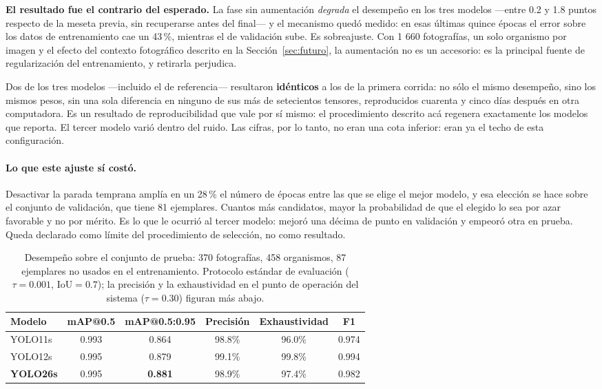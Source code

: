 \documentclass[onecolumn]{article}
\begin{document}
\textbf{El resultado fue el contrario del esperado.} La fase sin aumentación \emph{degrada} el desempeño en los tres modelos ---entre 0.2 y 1.8 puntos respecto de la meseta previa, sin recuperarse antes del final--- y el mecanismo quedó medido: en esas últimas quince épocas el error sobre los datos de entrenamiento cae un 43\,\%, mientras el de validación sube. Es sobreajuste. Con 1 660 fotografías, un solo organismo por imagen y el efecto del contexto fotográfico descrito en la Sección~\ref{sec:futuro}, la aumentación no es un accesorio: es la principal fuente de regularización del entrenamiento, y retirarla perjudica.

Dos de los tres modelos ---incluido el de referencia--- resultaron \textbf{idénticos} a los de la primera corrida: no sólo el mismo desempeño, sino los mismos pesos, sin una sola diferencia en ninguno de sus más de setecientos tensores, reproducidos cuarenta y cinco días después en otra computadora. Es un resultado de reproducibilidad que vale por sí mismo: el procedimiento descrito acá regenera exactamente los modelos que reporta. El tercer modelo varió dentro del ruido. Las cifras, por lo tanto, no eran una cota inferior: eran ya el techo de esta configuración.

\paragraph{Lo que este ajuste sí costó.} Desactivar la parada temprana amplía en un 28\,\% el número de épocas entre las que se elige el mejor modelo, y esa elección se hace sobre el conjunto de validación, que tiene 81 ejemplares. Cuantos más candidatos, mayor la probabilidad de que el elegido lo sea por azar favorable y no por mérito. Es lo que le ocurrió al tercer modelo: mejoró una décima de punto en validación y empeoró otra en prueba. Queda declarado como límite del procedimiento de selección, no como resultado.

\begin{table}[H]
\centering
\renewcommand{\arraystretch}{1.15}
\caption{Desempeño sobre el conjunto de prueba: 370 fotografías, 458 organismos, 87 ejemplares no usados en el entrenamiento. Protocolo estándar de evaluación ($\tau=0.001$, IoU$=0.7$); la precisión y la exhaustividad en el punto de operación del sistema ($\tau=0.30$) figuran más abajo.}
\label{tab:metricas}
\begin{tabular}{lccccc}
\hline
\textbf{Modelo} & \textbf{mAP@0.5} & \textbf{mAP@0.5:0.95} & \textbf{Precisión} & \textbf{Exhaustividad} & \textbf{F1} \\
\hline
YOLO11s & 0.993 & 0.864 & 98.8\% & 96.0\% & 0.974 \\
YOLO12s & 0.995 & 0.879 & 99.1\% & 99.8\% & 0.994 \\
\textbf{YOLO26s} & 0.995 & \textbf{0.881} & 98.9\% & 97.4\% & 0.982 \\
\hline
\end{tabular}
\end{table}
\end{document}
